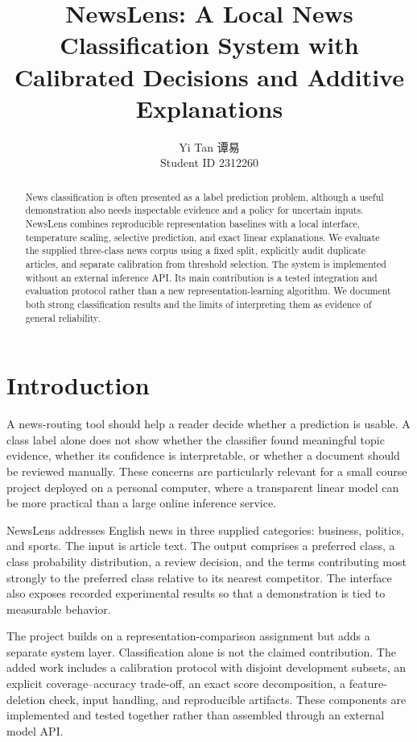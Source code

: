 \documentclass[11pt]{article}
\title{NewsLens: A Local News Classification System with Calibrated Decisions and Additive Explanations}
\author{Yi Tan {\cn 谭易} \\ Student ID 2312260}
\date{}
\begin{document}
\maketitle
\begin{abstract}
News classification is often presented as a label prediction problem, although a useful demonstration also needs inspectable evidence and a policy for uncertain inputs. NewsLens combines reproducible representation baselines with a local interface, temperature scaling, selective prediction, and exact linear explanations. We evaluate the supplied three-class news corpus using a fixed split, explicitly audit duplicate articles, and separate calibration from threshold selection. The system is implemented without an external inference API. Its main contribution is a tested integration and evaluation protocol rather than a new representation-learning algorithm. We document both strong classification results and the limits of interpreting them as evidence of general reliability.
\end{abstract}
\section{Introduction}
A news-routing tool should help a reader decide whether a prediction is usable. A class label alone does not show whether the classifier found meaningful topic evidence, whether its confidence is interpretable, or whether a document should be reviewed manually. These concerns are particularly relevant for a small course project deployed on a personal computer, where a transparent linear model can be more practical than a large online inference service.

NewsLens addresses English news in three supplied categories: business, politics, and sports. The input is article text. The output comprises a preferred class, a class probability distribution, a review decision, and the terms contributing most strongly to the preferred class relative to its nearest competitor. The interface also exposes recorded experimental results so that a demonstration is tied to measurable behavior.

The project builds on a representation-comparison assignment but adds a separate system layer. Classification alone is not the claimed contribution. The added work includes a calibration protocol with disjoint development subsets, an explicit coverage--accuracy trade-off, an exact score decomposition, a feature-deletion check, input handling, and reproducible artifacts. These components are implemented and tested together rather than assembled through an external model API.
\end{document}
